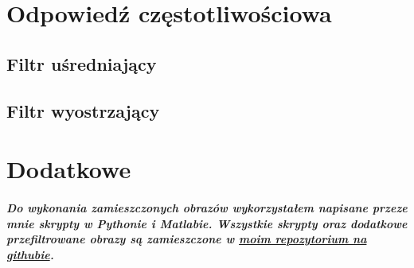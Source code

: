 \documentclass[a4paper,12pt,openany]{report}
\begin{document}
\chapter{Odpowiedź częstotliwościowa}

\section{Filtr uśredniający}

\section{Filtr wyostrzający}



\chapter{Dodatkowe}
\paragraph{Do wykonania zamieszczonych obrazów wykorzystałem napisane przeze mnie skrypty w Pythonie i Matlabie. Wszystkie skrypty oraz dodatkowe przefiltrowane obrazy są zamieszczone w \href{https://github.com/FilipM13/CPS}{moim repozytorium na githubie}.}

 
\end{document}
